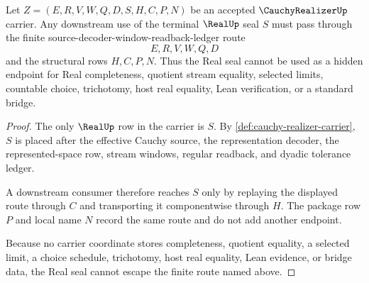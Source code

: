 \begin{theorem}
\label{thm:cauchy-realizer-real-seal-nonescape}
Let $Z=(E,R,V,W,Q,D,S,H,C,P,N)$ be an accepted $\CauchyRealizerUp$ carrier. Any downstream use of the terminal $\RealUp$ seal $S$ must pass through the finite source-decoder-window-readback-ledger route
$$
E,R,V,W,Q,D
$$
and the structural rows $H,C,P,N$. Thus the Real seal cannot be used as a hidden endpoint for Real completeness, quotient stream equality, selected limits, countable choice, trichotomy, host real equality, Lean verification, or a standard bridge.
\end{theorem}
\begin{proof}
The only $\RealUp$ row in the carrier is $S$. By \autoref{def:cauchy-realizer-carrier}, $S$ is placed after the effective Cauchy source, the representation decoder, the represented-space row, stream windows, regular readback, and dyadic tolerance ledger.

A downstream consumer therefore reaches $S$ only by replaying the displayed route through $C$ and transporting it componentwise through $H$. The package row $P$ and local name $N$ record the same route and do not add another endpoint.

Because no carrier coordinate stores completeness, quotient equality, a selected limit, a choice schedule, trichotomy, host real equality, Lean evidence, or bridge data, the Real seal cannot escape the finite route named above.
\end{proof}




